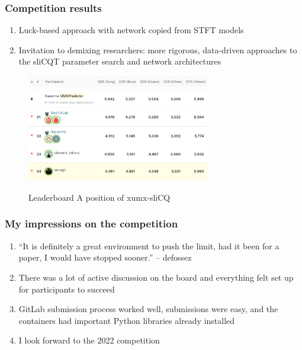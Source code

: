 \documentclass[usenames,dvipsnames]{beamer}
\begin{document}
\begin{frame}
	\frametitle{Competition results}
	\begin{enumerate}
	\item
		Luck-based approach with network copied from STFT models
	\item
		Invitation to demixing researchers: more rigorous, data-driven approaches to the sliCQT parameter search and network architectures
	\end{enumerate}
	\begin{figure}[ht]
		\centering
		\includegraphics[width=8cm]{./images-misc/leaderboard_header.png}\\
		\vspace{-0.25em}
		\includegraphics[width=8cm]{./images-misc/leaderboard_myplace.png}
		\caption{Leaderboard A position of xumx-sliCQ}
		\vspace{-1em}
	\end{figure}

\end{frame}

\begin{frame}
	\frametitle{My impressions on the competition}
	\begin{enumerate}
	\item
	 ``It is definitely a great environment to push the limit, had it been for a paper, I would have stopped sooner.'' -- defossez
	 \item
		 There was a lot of active discussion on the board and everything felt set up for participants to succeed
	 \item
		 GitLab submission process worked well, submissions were easy, and the containers had important Python libraries already installed
	 \item
		 I look forward to the 2022 competition
	\end{enumerate}
\end{frame}
\end{document}
